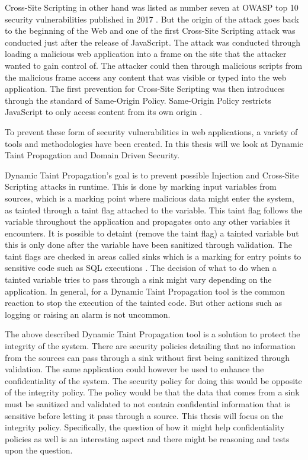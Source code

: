 \documentclass{../kththesis}
\begin{document}
Cross-Site Scripting in other hand was listed as number seven at OWASP top 10 security vulnerabilities published in 2017 \parencite{OWASP2017}. But the origin of the attack goes back to the beginning of the Web and one of the first Cross-Site Scripting attack was conducted just after the release of JavaScript. The attack was conducted through loading a malicious web application into a frame on the site that the attacker wanted to gain control of. The attacker could then through malicious scripts from the malicious frame access any content that was visible or typed into the web application. The first prevention for Cross-Site Scripting was then introduces through the standard of Same-Origin Policy. Same-Origin Policy restricts JavaScript to only access content from its own origin \parencite{FogieSeth2007Xacs, w3csop}.

To prevent these form of security vulnerabilities in web applications, a variety of tools and methodologies have been created. In this thesis will we look at Dynamic Taint Propagation and Domain Driven Security. 

Dynamic Taint Propagation’s goal is to prevent possible Injection and Cross-Site Scripting attacks in runtime. This is done by marking input variables from sources, which is a marking point where malicious data might enter the system, as tainted through a taint flag attached to the variable. This taint flag follows the variable throughout the application and propagates onto any other variables it encounters. It is possible to detaint (remove the taint flag) a tainted variable but this is only done after the variable have been sanitized through validation. The taint flags are checked in areas called sinks which is a marking for entry points to sensitive code such as SQL executions \parencite{Pan2015, Venkataramani2008}. The decision of what to do when a tainted variable tries to pass through a sink might vary depending on the application. In general, for a Dynamic Taint Propagation tool is the common reaction to stop the execution of the tainted code. But other actions such as logging or raising an alarm is not uncommon. 

The above described Dynamic Taint Propagation tool is a solution to protect the integrity of the system. There are security policies detailing that no information from the sources can pass through a sink without first being sanitized through validation. The same application could however be used to enhance the confidentiality of the system. The security policy for doing this would be opposite of the integrity policy. The policy would be that the data that comes from a sink must be sanitized and validated to not contain confidential information that is sensitive before letting it pass through a source. This thesis will focus on the integrity policy. Specifically, the question of how it might help confidentiality policies as well is an interesting aspect and there might be reasoning and tests upon the question.
\end{document}
